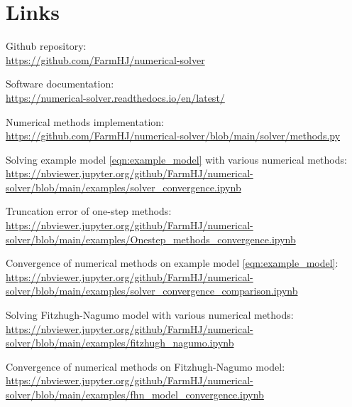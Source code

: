 \chapter{Links}
\label{chap:link}
\vspace{1em}

\noindent Github repository: \\
\url{https://github.com/FarmHJ/numerical-solver}
\vspace{1.1em}

\noindent Software documentation: \\
\url{https://numerical-solver.readthedocs.io/en/latest/}
\vspace{1.1em}

\noindent Numerical methods implementation: \\
\url{https://github.com/FarmHJ/numerical-solver/blob/main/solver/methods.py}
\vspace{1.1em}

\vspace{1em}

\noindent Solving example model \ref{eqn:example_model} with various numerical methods: \\
\url{https://nbviewer.jupyter.org/github/FarmHJ/numerical-solver/blob/main/examples/solver_convergence.ipynb} 
\vspace{1.1em}

\noindent Truncation error of one-step methods: \\
\url{https://nbviewer.jupyter.org/github/FarmHJ/numerical-solver/blob/main/examples/Onestep_methods_convergence.ipynb}
\vspace{1.1em}

\noindent Convergence of numerical methods on example model \ref{eqn:example_model}: \\
\url{https://nbviewer.jupyter.org/github/FarmHJ/numerical-solver/blob/main/examples/solver_convergence_comparison.ipynb}
\vspace{1.1em}

\noindent Solving Fitzhugh-Nagumo model with various numerical methods: \\
\url{https://nbviewer.jupyter.org/github/FarmHJ/numerical-solver/blob/main/examples/fitzhugh_nagumo.ipynb}
\vspace{1.1em}

\noindent Convergence of numerical methods on Fitzhugh-Nagumo model: \\
\url{https://nbviewer.jupyter.org/github/FarmHJ/numerical-solver/blob/main/examples/fhn_model_convergence.ipynb}
